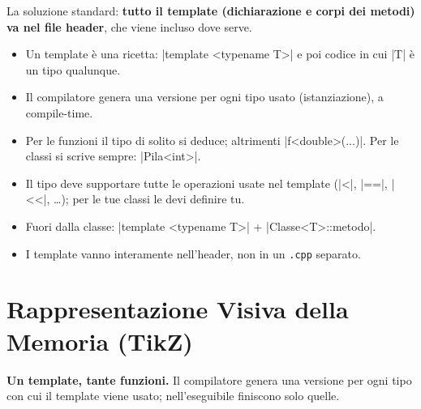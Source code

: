 La soluzione standard: \textbf{tutto il template (dichiarazione e corpi dei metodi)
va nel file header}, che viene incluso dove serve.

\begin{inparole}
\begin{itemize}
  \item Un template è una ricetta: \cc|template <typename T>| e poi codice in cui
        \cc|T| è un tipo qualunque.
  \item Il compilatore genera una versione per ogni tipo usato (istanziazione), a
        compile-time.
  \item Per le funzioni il tipo di solito si deduce; altrimenti
        \cc|f<double>(...)|. Per le classi si scrive sempre: \cc|Pila<int>|.
  \item Il tipo deve supportare tutte le operazioni usate nel template (\cc|<|,
        \cc|==|, \cc|<<|, \ldots); per le tue classi le devi definire tu.
  \item Fuori dalla classe: \cc|template <typename T>| + \cc|Classe<T>::metodo|.
  \item I template vanno interamente nell'header, non in un \texttt{.cpp} separato.
\end{itemize}
\end{inparole}

\section{Rappresentazione Visiva della Memoria (TikZ)}

\textbf{Un template, tante funzioni.} Il compilatore genera una versione per ogni
tipo con cui il template viene usato; nell'eseguibile finiscono solo quelle.
\begin{center}
\end{center}

